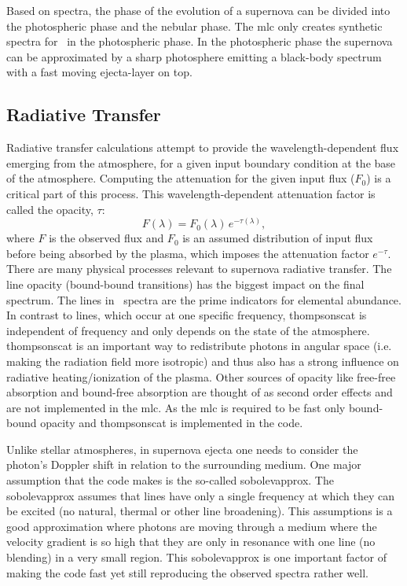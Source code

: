 Based on spectra, the phase of the evolution of a supernova can be divided into the photospheric phase and the nebular phase. The \gls{mlc} only creates synthetic spectra for \snia\ in the photospheric phase. In the photospheric phase the supernova can be approximated by a sharp photosphere emitting a black-body spectrum with a fast moving ejecta-layer on top.

\subsection{Radiative Transfer}
Radiative transfer calculations attempt to provide the wavelength-dependent flux emerging from the atmosphere, for a given input boundary condition at the base of the atmosphere. Computing the attenuation for the given input flux ($F_0$) is a critical part of this process. This wavelength-dependent attenuation factor is called the opacity, $\tau$:
\begin{equation}
\label{eq:rad_trans}
	F(\lambda) = F_0(\lambda)\,e^{-\tau(\lambda)},
\end{equation}
where $F$ is the observed flux and $F_0$ is an assumed distribution of input flux before being absorbed by the plasma, which imposes the attenuation factor $e^{-\tau}$.
There are many physical processes relevant to supernova radiative transfer. The line opacity (bound-bound transitions) has the biggest impact on the final spectrum. The lines in \snia\ spectra are the prime indicators for elemental abundance. In contrast to lines, which occur at one specific frequency, \gls{thompsonscat} is independent of frequency and only depends on the state of the atmosphere. \gls{thompsonscat} is an important way to redistribute photons in angular space (i.e. making the radiation field more isotropic) and thus also has a strong influence on radiative heating/ionization of the plasma. Other sources of opacity like free-free absorption and bound-free absorption are thought of as second order effects and are not implemented in the \gls{mlc}. As the \gls{mlc} is required to be fast only bound-bound opacity and \gls{thompsonscat} is implemented in the code.

Unlike stellar atmospheres, in supernova ejecta one needs to consider the photon's Doppler shift in relation to the surrounding medium. One major assumption that the code makes is the so-called \gls{sobolevapprox}. The \gls{sobolevapprox} assumes that lines have only a single frequency at which they can be excited  (no natural, thermal or other line broadening). This assumptions is a good approximation where photons are moving through a medium where the velocity gradient is so high that they are only in resonance with one line (no blending) in a very small region. This \gls{sobolevapprox} is one important factor of making the code fast yet still reproducing the observed spectra rather well.

